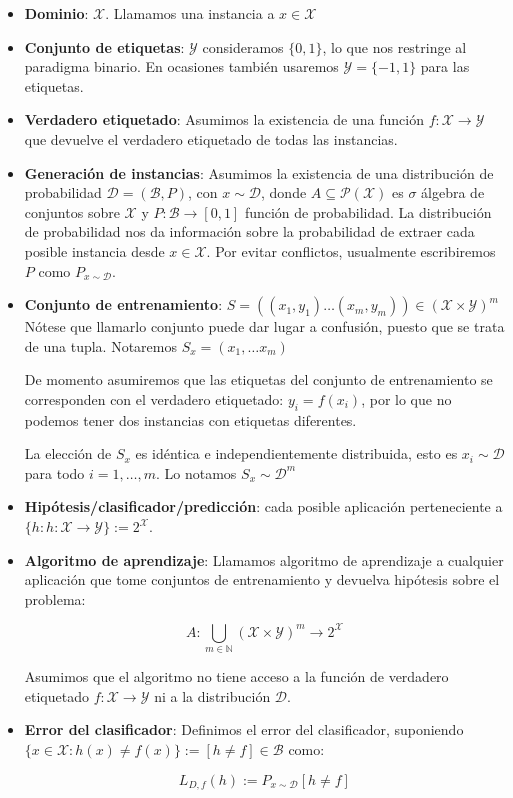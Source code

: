 \begin{itemize}
\item \textbf{Dominio}: $\mathcal{X}$. Llamamos una instancia a $x\in \mathcal{X}$
\item \textbf{Conjunto de etiquetas}: $\mathcal{Y}$ consideramos $\{0,1\}$, lo que nos restringe al paradigma binario. En ocasiones 
también usaremos $\mathcal{Y} = \{-1,1\}$ para las etiquetas.
\item \textbf{Verdadero etiquetado}: \sloppy Asumimos la existencia de una función ${f: \mathcal{X} \rightarrow \mathcal{Y}}$ 
que devuelve el verdadero etiquetado de todas las instancias.
\item \textbf{Generación de instancias}: \fussy Asumimos la existencia de una distribución de probabilidad $\mathcal{D} = (\mathcal{B}, P)$, 
con $x\sim \mathcal{D}$, donde $A\subseteq \mathcal{P}(\mathcal{X})$ es $\sigma$ álgebra de conjuntos sobre $\mathcal{X}$ y $P: \mathcal{B} \rightarrow [0,1]$
función de probabilidad. La distribución de probabilidad nos da información sobre la probabilidad de extraer cada posible instancia desde 
$x \in \mathcal{X}$. Por evitar conflictos, usualmente escribiremos $P$ como $P_{x\sim \mathcal{D}}$.

\item \textbf{Conjunto de entrenamiento}: $S = ((x_1,y_1) \ldots (x_m,y_m)) \in (\mathcal{X} \times \mathcal{Y})^m$ 
Nótese que llamarlo conjunto puede dar lugar a confusión, puesto que se trata de una tupla. Notaremos $S_x = (x_1, \ldots x_m)$

De momento asumiremos que las etiquetas del conjunto de entrenamiento se corresponden con el verdadero etiquetado: 
$y_i = f(x_i)$, por lo que no podemos tener dos instancias con etiquetas diferentes.

La elección de $S_x$ es idéntica e independientemente distribuida, esto es $x_i \sim \mathcal{D}$ para todo $i=1, \ldots, m$.
Lo notamos $S_x \sim \mathcal{D}^m$

\item \textbf{Hipótesis/clasificador/predicción}: cada posible aplicación perteneciente a 
$\{h: h:\mathcal{X} \rightarrow \mathcal{Y}\} := 2^{\mathcal{X}}$. 

\item \textbf{Algoritmo de aprendizaje}: Llamamos algoritmo de aprendizaje a cualquier aplicación que tome conjuntos de entrenamiento
y devuelva hipótesis sobre el problema:

\[A: \underset{m\in \mathbb{N}}{\bigcup} (\mathcal{X}\times\mathcal{Y})^m \rightarrow 2^{\mathcal{X}}\]

Asumimos que el algoritmo no tiene acceso a la función de verdadero etiquetado $f: \mathcal{X} \rightarrow \mathcal{Y}$ ni a
la distribución $\mathcal{D}$.

\item \textbf{Error del clasificador}: Definimos el error del clasificador, suponiendo 
$\{x\in \mathcal{X} : h(x) \neq f(x)\} := [h\neq f] \in \mathcal{B}$ como:

\[L_{D,f}(h) :=  P_{x\sim \mathcal{D}} [h \neq f]\]
\end{itemize}


